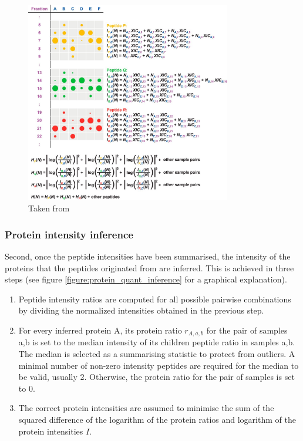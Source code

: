 \documentclass[11pt, a4paper]{report}
\begin{document}
\begin{figure}[!h]
\centering
\includegraphics[width=0.8\textwidth]{xic_normalization}
\caption{Taken from \cite{Cox2014}}
\label{figure:xic_normalization}
\end{figure}


\subsubsection{Protein intensity inference}

Second, once the peptide intensities have been summarised, the intensity of the proteins that the peptides originated from are inferred. This is achieved in three steps (see figure \ref{figure:protein_quant_inference} for a graphical explanation).

\begin{enumerate}
\item Peptide intensity ratios are computed for all possible pairwise combinations by dividing the normalized intensities obtained in the previous step.

\item For every inferred protein A, its protein ratio $r_{A, a,b}$ for the pair of samples a,b is set to the median intensity of its children peptide ratio in samples a,b. The median is selected as a summarising statistic to protect from outliers. A minimal number of non-zero intensity peptides are required for the median to be valid, usually 2. Otherwise, the protein ratio for the pair of samples is set to 0.

\item The correct protein intensities are assumed to minimise the sum of the squared difference of the logarithm of the protein ratios and logarithm of the protein intensities $I$.

\end{enumerate}
\end{document}
